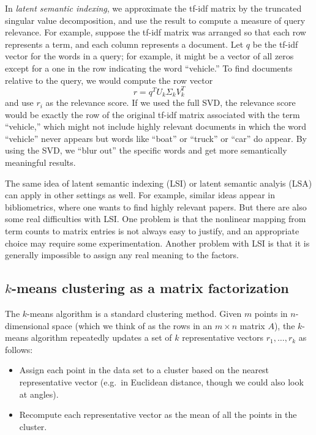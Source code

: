\documentclass[12pt, leqno]{article} %
\begin{document}
In {\em latent semantic indexing}, we approximate the tf-idf matrix
by the truncated singular value decomposition, and use the result to
compute a measure of query relevance.  For example, suppose the tf-idf
matrix was arranged so that each row represents a term, and each
column represents a document.  Let $q$ be the tf-idf vector for the
words in a query; for example, it might be a vector of all zeros
except for a one in the row indicating the word ``vehicle.''  To find
documents relative to the query, we would compute the row vector
\[
  r = q^T U_k \Sigma_k V_k^T
\]
and use $r_i$ as the relevance score.  If we used the full SVD, the
relevance score would be exactly the row of the original tf-idf matrix
associated with the term ``vehicle,'' which might not include highly
relevant documents in which the word ``vehicle'' never appears but
words like ``boat'' or ``truck'' or ``car'' do appear.  By using the
SVD, we ``blur out'' the specific words and get more semantically
meaningful results.

The same idea of latent semantic indexing (LSI) or latent semantic
analyis (LSA) can apply in other settings as well.  For example,
similar ideas appear in bibliometrics, where one wants to find highly
relevant papers.  But there are also some real difficulties with LSI.
One problem is that the nonlinear mapping from term counts to matrix
entries is not always easy to justify, and an appropriate choice may
require some experimentation.  Another problem with LSI is that it is
generally impossible to assign any real meaning to the factors.

\subsection{$k$-means clustering as a matrix factorization}

The $k$-means algorithm is a standard clustering method.  Given $m$
points in $n$-dimensional space (which we think of as the rows in an
$m \times n$ matrix $A$), the $k$-means algorithm repeatedly updates a set
of $k$ representative vectors $r_1, \ldots, r_k$ as follows:
\begin{itemize}
\item
  Assign each point in the data set to a cluster based on the nearest
  representative vector (e.g.~in Euclidean distance, though we could
  also look at angles).
\item
  Recompute each representative vector as the mean of all the points
  in the cluster.
\end{itemize}
\end{document}
